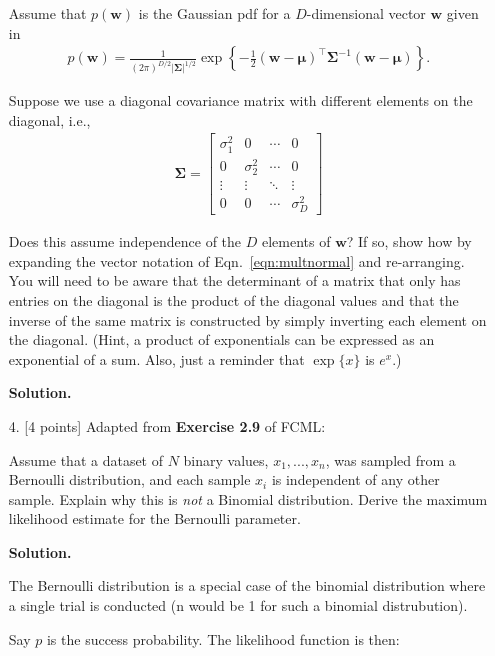 \documentclass[10pt]{article}
\begin{document}
\begin{itemize}
Assume that $p(\mathbf{w})$ is the Gaussian pdf for a $D$-dimensional vector $\mathbf{w}$ given in
\begin{eqnarray}
p(\mathbf{w}) = \frac{1}{(2 \pi)^{D/2} | \mathbf{\Sigma} |^{1/2}} \exp \left\{ -\frac{1}{2} (\mathbf{w} - \mathbf{\mu})^\top \mathbf{\Sigma}^{-1} (\mathbf{w} - \mathbf{\mu}) \right\} . \label{eqn:multnormal}
\end{eqnarray}

Suppose we use a diagonal covariance matrix with different elements on the diagonal, i.e.,
\begin{eqnarray*}
\mathbf{\Sigma} = 
\begin{bmatrix}
\sigma_1^2 & 0 & \cdots & 0 \\
0 & \sigma_2^2 & \cdots & 0 \\
\vdots & \vdots & \ddots & \vdots \\
0 & 0 & \cdots & \sigma_D^2
\end{bmatrix}
\end{eqnarray*}

Does this assume independence of the $D$ elements of $\mathbf{w}$?  If so, show how by expanding the vector notation of Eqn.~\ref{eqn:multnormal} and re-arranging.  You will need to be aware that the determinant of a matrix that only has entries on the diagonal is the product of the diagonal values and that the inverse of the same matrix is constructed by simply inverting each element on the diagonal.  (Hint, a product of exponentials can be expressed as an exponential of a sum.  Also, just a reminder that $\exp\{x\}$ is $e^x$.)

{\bf Solution.}



\item[4.] [4 points]
Adapted from {\bf Exercise 2.9} of FCML:

Assume that a dataset of $N$ binary values, $x_1, ..., x_n$, was sampled from a Bernoulli distribution, and each sample $x_i$ is independent of any other sample.  Explain why this is {\em not} a Binomial distribution.  Derive the maximum likelihood estimate for the Bernoulli parameter.

{\bf Solution.} 

The Bernoulli distribution is a special case of the binomial distribution where a single trial is conducted (n would be 1 for such a binomial distrubution).

Say $p$ is the success probability. The likelihood function is then:


\end{itemize}
\end{document}
